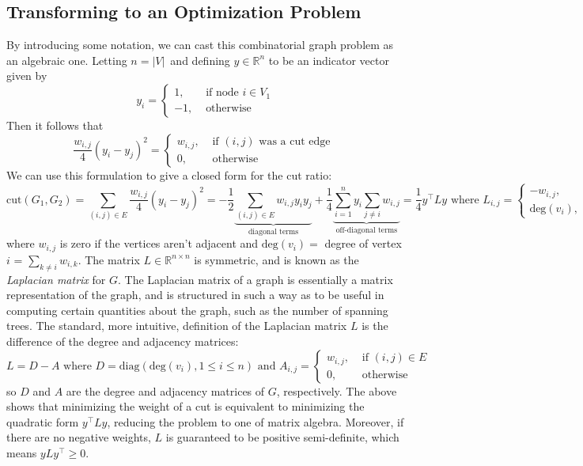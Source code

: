 \documentclass{article}
\begin{document}
\subsection{Transforming to an Optimization Problem}
By introducing some notation, we can cast this combinatorial graph problem as an algebraic one. Letting $ n = | V | $ and defining $ y \in \mathbb{R}^n $ to be an indicator vector given by
$$ y_i = \begin{cases}
    1, & \text{ if node } i \in V_1 \\
    -1, & \text{ otherwise }
\end{cases} $$
Then it follows that
$$ \frac{w_{i, j}}{4} (y_i - y_j)^2 = \begin{cases}
    w_{i, j}, & \text{ if } (i, j) \text{ was a cut edge } \\
    0, & \text{ otherwise }
\end{cases} $$
We can use this formulation to give a closed form for the cut ratio:
$$ \text{cut}(G_1, G_2) = \sum_{(i, j) \in E} \frac{w_{i, j}}{4} (y_i - y_j)^2 = - \frac{1}{2} \underbrace{\sum_{(i, j) \in E} w_{i, j} y_i y_j}_\text{diagonal terms} + \frac{1}{4} \underbrace{\sum_{i = 1}^n y_i \sum_{j \neq i} w_{i, j}}_\text{off-diagonal terms} = \frac{1}{4} y^\intercal L y \text{ where } L_{i, j} = \begin{cases}
    - w_{i, j}, & \text{ if } i \neq j \\
    \text{deg}(v_i), & \text{ otherwise }
\end{cases} $$
where $ w_{i, j} $ is zero if the vertices aren't adjacent and $ \text{deg}(v_i) = $ degree of vertex $ i $ = $ \sum_{k \neq i} w_{i, k} $. The matrix $ L \in \mathbb{R}^{n \times n} $ is symmetric, and is known as the \textit{Laplacian matrix} for $ G $. The Laplacian matrix of a graph is essentially a matrix representation of the graph, and is structured in such a way as to be useful in computing certain quantities about the graph, such as the number of spanning trees. The standard, more intuitive, definition of the Laplacian matrix $ L $ is the difference of the degree and adjacency matrices:
$$ L = D - A \text{ where } D = \text{diag}(\text{deg}(v_i), 1 \leq i \leq n) \text{ and } A_{i, j} = \begin{cases}
    w_{i, j}, & \text{ if } (i, j) \in E \\
    0, & \text{ otherwise }
\end{cases} $$
so $ D $ and $ A $ are the degree and adjacency matrices of $ G $, respectively. The above shows that minimizing the weight of a cut is equivalent to minimizing the quadratic form $ y^\intercal L y $, reducing the problem to one of matrix algebra. Moreover, if there are no negative weights, $ L $ is guaranteed to be positive semi-definite, which means $ y L y^\intercal \geq 0 $.
\end{document}
